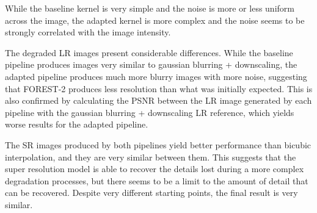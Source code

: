         While the baseline kernel is very simple and the noise is more or less uniform across the image, the adapted kernel is more complex and the noise seems to be strongly correlated with the image intensity.

        The degraded LR images present considerable differences. While the baseline pipeline produces images very similar to gaussian blurring + downscaling, 
        the adapted pipeline produces much more blurry images with more noise, suggesting that FOREST-2 produces less resolution than what was initially expected. 
        This is also confirmed by calculating the PSNR between the LR image generated by each pipeline with the gaussian blurring + downscaling LR reference, which yields worse results for the adapted pipeline.
        
        The SR images produced by both pipelines yield better performance than bicubic interpolation, and they are very similar between them.
        This suggests that the super resolution model is able to recover the details lost during a more complex degradation processes, but there seems to be a limit to the amount of detail that can be recovered. Despite very different starting points, the final result is very similar.

        
        

